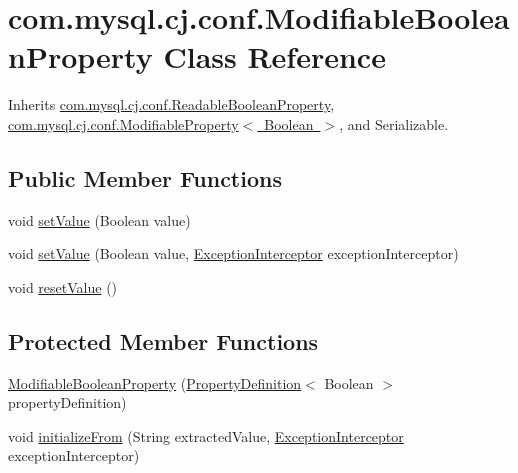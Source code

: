 \hypertarget{classcom_1_1mysql_1_1cj_1_1conf_1_1_modifiable_boolean_property}{}\section{com.\+mysql.\+cj.\+conf.\+Modifiable\+Boolean\+Property Class Reference}
\label{classcom_1_1mysql_1_1cj_1_1conf_1_1_modifiable_boolean_property}


Inherits \mbox{\hyperlink{classcom_1_1mysql_1_1cj_1_1conf_1_1_readable_boolean_property}{com.\+mysql.\+cj.\+conf.\+Readable\+Boolean\+Property}}, \mbox{\hyperlink{interfacecom_1_1mysql_1_1cj_1_1conf_1_1_modifiable_property}{com.\+mysql.\+cj.\+conf.\+Modifiable\+Property$<$ Boolean $>$}}, and Serializable.

\subsection*{Public Member Functions}
\begin{DoxyCompactItemize}
\item 
void \mbox{\hyperlink{classcom_1_1mysql_1_1cj_1_1conf_1_1_modifiable_boolean_property_aae3d70277b6a1ca62bd6332d52555f86}{set\+Value}} (Boolean value)
\item 
void \mbox{\hyperlink{classcom_1_1mysql_1_1cj_1_1conf_1_1_modifiable_boolean_property_a69e5fe878019d88d2445d88f402a41f0}{set\+Value}} (Boolean value, \mbox{\hyperlink{interfacecom_1_1mysql_1_1cj_1_1exceptions_1_1_exception_interceptor}{Exception\+Interceptor}} exception\+Interceptor)
\item 
void \mbox{\hyperlink{classcom_1_1mysql_1_1cj_1_1conf_1_1_modifiable_boolean_property_a805e761180b7f07f5223557c70eacd46}{reset\+Value}} ()
\end{DoxyCompactItemize}
\subsection*{Protected Member Functions}
\begin{DoxyCompactItemize}
\item 
\mbox{\hyperlink{classcom_1_1mysql_1_1cj_1_1conf_1_1_modifiable_boolean_property_a934c78f3cdc4dbc27413543913934cd2}{Modifiable\+Boolean\+Property}} (\mbox{\hyperlink{interfacecom_1_1mysql_1_1cj_1_1conf_1_1_property_definition}{Property\+Definition}}$<$ Boolean $>$ property\+Definition)
\item 
void \mbox{\hyperlink{classcom_1_1mysql_1_1cj_1_1conf_1_1_modifiable_boolean_property_a7346523d45730c72d95548c2d7cc3a6f}{initialize\+From}} (String extracted\+Value, \mbox{\hyperlink{interfacecom_1_1mysql_1_1cj_1_1exceptions_1_1_exception_interceptor}{Exception\+Interceptor}} exception\+Interceptor)
\end{DoxyCompactItemize}


